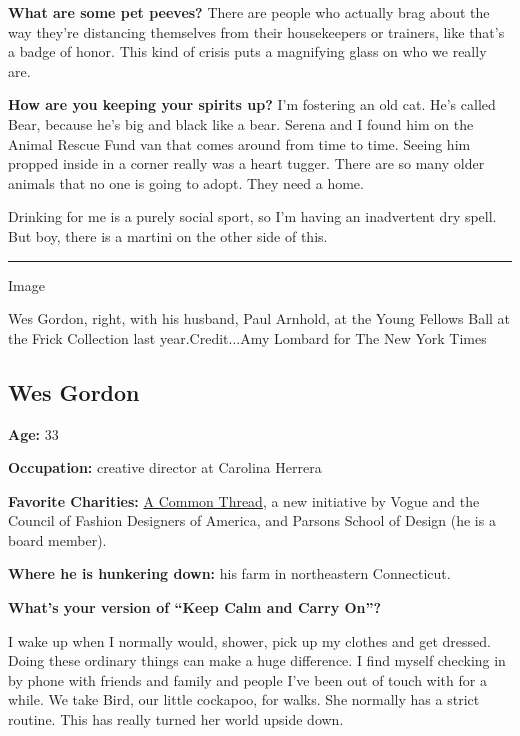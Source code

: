 \textbf{What are some pet peeves?} There are people who actually brag
about the way they're distancing themselves from their housekeepers or
trainers, like that's a badge of honor. This kind of crisis puts a
magnifying glass on who we really are.

\textbf{How are you keeping your spirits up?} I'm fostering an old cat.
He's called Bear, because he's big and black like a bear. Serena and I
found him on the Animal Rescue Fund van that comes around from time to
time. Seeing him propped inside in a corner really was a heart tugger.
There are so many older animals that no one is going to adopt. They need
a home.

Drinking for me is a purely social sport, so I'm having an inadvertent
dry spell. But boy, there is a martini on the other side of this.

\begin{center}\rule{0.5\linewidth}{\linethickness}\end{center}

Image

Wes Gordon, right, with his husband, Paul Arnhold, at the Young Fellows
Ball at the Frick Collection last year.Credit...Amy Lombard for The New
York Times

\hypertarget{wes-gordon}{%
\subsection{Wes Gordon}\label{wes-gordon}}

\textbf{Age:} 33

\textbf{Occupation:} creative director at Carolina Herrera

\textbf{Favorite Charities:}
\href{https://www.nytimes3xbfgragh.onion/2020/03/24/style/coronavirus-fashion-rescue-plan.html}{A
Common Thread}, a new initiative by Vogue and the Council of Fashion
Designers of America, and Parsons School of Design (he is a board
member).

\textbf{Where he is hunkering down:} his farm in northeastern
Connecticut.

\textbf{What's your version of ``Keep Calm and Carry On''?}

I wake up when I normally would, shower, pick up my clothes and get
dressed. Doing these ordinary things can make a huge difference. I find
myself checking in by phone with friends and family and people I've been
out of touch with for a while. We take Bird, our little cockapoo, for
walks. She normally has a strict routine. This has really turned her
world upside down.


